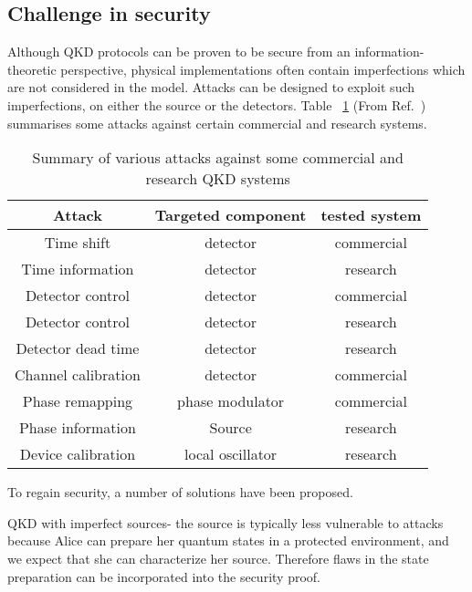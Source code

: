 \subsection{Challenge in security}
Although QKD protocols can be proven to be secure from an information-theoretic perspective, physical implementations often contain imperfections which are not considered in the model. Attacks can be designed to exploit such imperfections, on either the source or the detectors.
% 
Table ~\ref{attacks} (From Ref.~\cite{lo2014secure}) summarises some attacks against certain commercial and research systems.

\begin{table}
\begin{tabular}{ |c|c|c| } 
 \hline
 Attack &  Targeted component & tested system\\ 
  \hline
Time shift\cite{qi2005time,PhysRevA.78.042333,PhysRevA.74.022313}
        & detector & commercial \\
Time information\cite{lamas2007breaking}  & detector & research \\
Detector control \cite{lydersen2010hacking,yuan2010avoiding}  & detector  &   commercial \\
Detector control \cite{gerhardt2011full}    & detector  & research  \\
Detector dead time\cite{weier2011quantum}     & detector  & research         \\
Channel calibration\cite{jain2011device}    & detector  &  commercial        \\
Phase remapping\cite{xu2010experimental} &  phase modulator & commercial \\
Phase information\cite{tang2013source} & Source & research           \\
Device calibration\cite{jouguet2013preventing} & local oscillator & research \\
                \hline
\end{tabular}
\caption{\label{attacks} Summary of various attacks against some commercial and 
research QKD systems}
\end{table}

To regain security, a number of solutions have been proposed. 

QKD with imperfect sources-
the source is typically less vulnerable to attacks because Alice can prepare her quantum states in
a protected environment, and we expect that she can characterize her source. Therefore flaws in the state preparation can be incorporated into the security proof.


